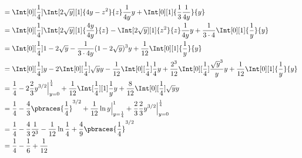 \begin{solution}
\begin{enumerate}[label = (\alph*)]
    \begin{align*}
        & =
        \Int[0][\frac{1}{4}]
        {
            \Int[2 \sqrt y][1]
            {
                4 y - z^2
            }{z}
            \frac{1}{4 y}
        }{y}
        +
        \Int[0][1]
        {
            \frac{1}{3}
            \frac{1}{4 y}
        }{y} \\
        & =
        \Int[0][\frac{1}{4}]
        {
            \Int[2 \sqrt y][1]
            {
                \frac{4 y}{4 y}
            }{z}
            -
            \Int[2 \sqrt y][1]
            {
                z^2
            }{z}
            \frac{1}{4 y}
        }{y}
        +
        \frac{1}{3 \cdot 4}
        \Int[0][1]
        {
            \frac{1}{y}
        }{y} \\
        & =
        \Int[0][\frac{1}{4}]
        {
            1 - 2 \sqrt y
            -
            \frac{1}{3 \cdot 4 y}
            (1 - 2 \sqrt y)^3
        }{y}
        +
        \frac{1}{12}
        \Int[0][1]
        {
            \frac{1}{y}
        }{y} \\
        & =
        \Int[0][\frac{1}{4}]{}{y}
        -
        2
        \Int[0][\frac{1}{4}]
        {
            \sqrt y
        }{y}
        -
        \frac{1}{12}
        \Int[0][\frac{1}{4}]
        {
            \frac{1}{4}
        }{y}
        +
        \frac{2^3}{12}
        \Int[0][\frac{1}{4}]
        {
            \frac{\sqrt y^3}{y}
        }{y}
        +
        \frac{1}{12}
        \Int[0][1]
        {
            \frac{1}{y}
        }{y} \\
        & =
        \frac{1}{4}
        -
        2 \frac{2}{3} y^{3/2} \Big |_{y=0}^\frac{1}{4}
        +
        \frac{1}{12}
        \Int[\frac{1}{4}][1]
        {
            \frac{1}{y}
        }{y}
        +
        \frac{8}{12}
        \Int[0][\frac{1}{4}]
        {
            \sqrt y
        }{y} \\
        & =
        \frac{1}{4}
        -
        \frac{4}{3}
        \pbraces{\frac{1}{4}}^{3 / 2}
        +
        \frac{1}{12}
        \ln y \Big |_{y = \frac{1}{4}}^1
        +
        \frac{2}{3}
        \frac{2}{3}
        y^{3/2} \Big |_{y=0}^\frac{1}{4} \\
        & =
        \frac{1}{4}
        -
        \frac{4}{3}
        \frac{1}{2^3}
        -
        \frac{1}{12}
        \ln \frac{1}{4}
        +
        \frac{4}{9}
        \pbraces{\frac{1}{4}}^{3/2} \\
        & =
        \frac{1}{4}
        -
        \frac{1}{6}
        +
        \frac{1}{12}

\end{align*}
\end{enumerate}
\end{solution}

